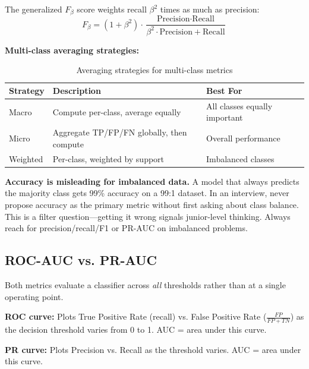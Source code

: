 The generalized $F_\beta$ score weights recall $\beta^2$ times as much as precision:
\[
F_\beta = (1 + \beta^2) \cdot \frac{\text{Precision} \cdot \text{Recall}}{\beta^2 \cdot \text{Precision} + \text{Recall}}
\]

\textbf{Multi-class averaging strategies:}

\begin{table}[H]
\centering
\caption{Averaging strategies for multi-class metrics}
\begin{tabularx}{\textwidth}{lXl}
\toprule
\textbf{Strategy} & \textbf{Description} & \textbf{Best For} \\
\midrule
Macro & Compute per-class, average equally & All classes equally important \\
Micro & Aggregate TP/FP/FN globally, then compute & Overall performance \\
Weighted & Per-class, weighted by support & Imbalanced classes \\
\bottomrule
\end{tabularx}
\end{table}

\begin{warningbox}
\textbf{Accuracy is misleading for imbalanced data.} A model that always predicts the majority class gets 99\% accuracy on a 99:1 dataset. In an interview, never propose accuracy as the primary metric without first asking about class balance. This is a filter question---getting it wrong signals junior-level thinking. Always reach for precision/recall/F1 or PR-AUC on imbalanced problems.
\end{warningbox}

\subsection{ROC-AUC vs. PR-AUC}

Both metrics evaluate a classifier across \textit{all} thresholds rather than at a single operating point.

\textbf{ROC curve:} Plots True Positive Rate (recall) vs. False Positive Rate ($\frac{FP}{FP+TN}$) as the decision threshold varies from 0 to 1. AUC = area under this curve.

\textbf{PR curve:} Plots Precision vs. Recall as the threshold varies. AUC = area under this curve.

